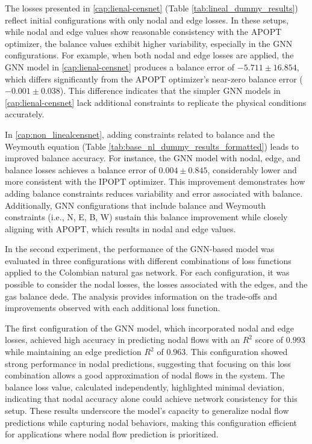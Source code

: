 The losses presented in \cref{cap:lienal-censnet} (Table \ref{tab:lineal_dummy_results}) reflect initial configurations with only nodal and edge losses. In these setups, while nodal and edge values show reasonable consistency with the APOPT optimizer, the balance values exhibit higher variability, especially in the GNN configurations. For example, when both nodal and edge losses are applied, the GNN model in \cref{cap:lienal-censnet} produces a balance error of \(-5.711 \pm 16.854\), which differs significantly from the APOPT optimizer's near-zero balance error (\(-0.001 \pm 0.038\)). This difference indicates that the simpler GNN models in \cref{cap:lienal-censnet} lack additional constraints to replicate the physical conditions accurately.

In \cref{cap:non_linealcensnet}, adding constraints related to balance and the Weymouth equation (Table \ref{tab:base_nl_dummy_results_formatted}) leads to improved balance accuracy. For instance, the GNN model with nodal, edge, and balance losses achieves a balance error of \(0.004 \pm 0.845\), considerably lower and more consistent with the IPOPT optimizer. This improvement demonstrates how adding balance constraints reduces variability and error associated with balance. Additionally, GNN configurations that include balance and Weymouth constraints (i.e., N, E, B, W) sustain this balance improvement while closely aligning with APOPT, which results in nodal and edge values.




In the second experiment, the performance of the GNN-based model was evaluated in three configurations with different combinations of loss functions applied to the Colombian natural gas network. For each configuration, it was possible to consider the nodal losses, the losses associated with the edges, and the gas balance dede. The analysis provides information on the trade-offs and improvements observed with each additional loss function.

The first configuration of the GNN model, which incorporated nodal and edge losses, achieved high accuracy in predicting nodal flows with an $R^2$ score of $0.993$ while maintaining an edge prediction $R^2$ of $0.963$. This configuration showed strong performance in nodal predictions,  suggesting that focusing on this loss combination allows a good approximation of nodal flows in the system. The balance loss value, calculated independently, highlighted minimal deviation, indicating that nodal accuracy alone could achieve network consistency for this setup. These results underscore the model's capacity to generalize nodal flow predictions while capturing nodal behaviors, making this configuration efficient for applications where nodal flow prediction is prioritized.

